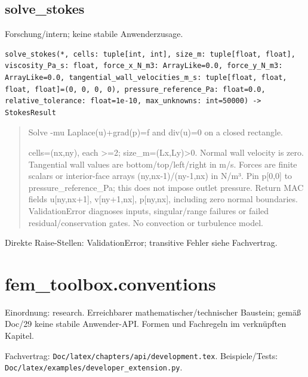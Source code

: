 \subsection{solve\_stokes}
Forschung/intern; keine stabile Anwenderzusage.
\begin{lstlisting}
solve_stokes(*, cells: tuple[int, int], size_m: tuple[float, float], viscosity_Pa_s: float, force_x_N_m3: ArrayLike=0.0, force_y_N_m3: ArrayLike=0.0, tangential_wall_velocities_m_s: tuple[float, float, float, float]=(0, 0, 0, 0), pressure_reference_Pa: float=0.0, relative_tolerance: float=1e-10, max_unknowns: int=50000) -> StokesResult
\end{lstlisting}
\begin{quote}
Solve -mu Laplace(u)+grad(p)=f and div(u)=0 on a closed rectangle.\par cells=(nx,ny), each >=2; size\_m=(Lx,Ly)>0. Normal wall velocity is zero. Tangential wall values are bottom/top/left/right in m/s. Forces are finite scalars or interior-face arrays (ny,nx-1)/(ny-1,nx) in N/m³. Pin p[0,0] to pressure\_reference\_Pa; this does not impose outlet pressure. Return MAC fields u[ny,nx+1], v[ny+1,nx], p[ny,nx], including zero normal boundaries. ValidationError diagnoses inputs, singular/range failures or failed residual/conservation gates. No convection or turbulence model.
\end{quote}
Direkte Raise-Stellen: ValidationError; transitive Fehler siehe Fachvertrag.
\section{fem\_toolbox.conventions}
Einordnung: research. Erreichbarer mathematischer/technischer Baustein; gemäß Doc/29 keine stabile Anwender-API. Formen und Fachregeln im verknüpften Kapitel.
\par Fachvertrag: \nolinkurl{Doc/latex/chapters/api/development.tex}. Beispiele/Tests:
\nolinkurl{Doc/latex/examples/developer_extension.py}.

